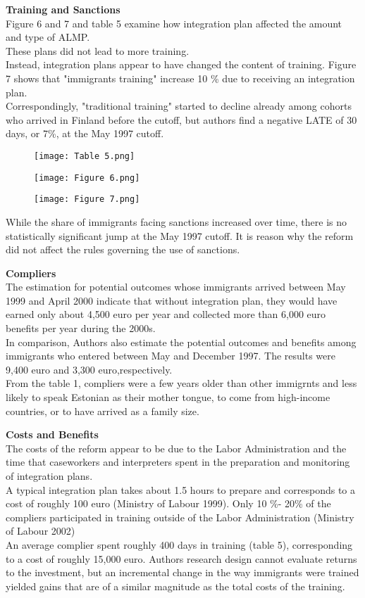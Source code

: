 \documentclass[../root]{subfiles}
\begin{document}
    {\bf Training and Sanctions} \\
    Figure 6 and 7 and table 5 examine how integration plan affected the amount and type of ALMP. \\
    These plans did not lead to more training.  \\
    Instead, integration plans appear to have changed the content of training. Figure 7 shows that "immigrants training"  increase 10 \% due to receiving an integration plan. \\
    Correspondingly, "traditional training" started to decline already among cohorts who arrived in Finland before the cutoff, but authors find a negative LATE of 30 days, or 7\%, at the May 1997 cutoff. 
  \begin{figure}[h]
        \texttt{[image: Table 5.png]}
    \end{figure}
    \begin{figure}[h]
        \texttt{[image: Figure 6.png]}
    \end{figure}
    \begin{figure}[h]
        \texttt{[image: Figure 7.png]}
    \end{figure}
    While the share of immigrants facing sanctions increased over time, there is no statistically significant jump at the May 1997 cutoff. It is reason why the reform did not affect the rules governing the use of sanctions.
    
    {\bf Compliers} \\
    The estimation for potential outcomes whose immigrants arrived between May 1999 and April 2000 indicate that without integration plan, they would have earned only about 4,500 euro per year and collected more than 6,000 euro benefits per year during the 2000s. \\
    In comparison, Authors also estimate the potential outcomes and benefits among immigrants who entered between May and December 1997.  The results were 9,400 euro and 3,300 euro,respectively. \\
    From the table 1, compliers were a few years older than other immigrnts and less likely to speak Estonian as their mother tongue, to come from high-income countries, or to have arrived as a family size. 
    
    {\bf Costs and Benefits} \\
    The costs of the reform appear to be due to the Labor Administration and the time that caseworkers and interpreters spent in the preparation and monitoring of integration plans. \\
    A typical integration plan takes about 1.5 hours to prepare and corresponds to a cost of roughly 100 euro (Ministry of Labour 1999).
    Only 10 \%- 20\% of the compliers participated in training outside of the Labor Administration (Ministry of Labour 2002) \\
    An average complier spent roughly 400 days in training (table 5), corresponding to a cost of roughly 15,000 euro.
    Authors research design cannot evaluate returns to the investment, but an incremental change in the way immigrants were trained yielded gains that are of a similar magnitude as the total costs of the training.
    
\end{document}
